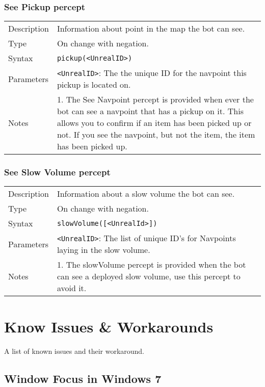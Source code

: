 \documentclass[11pt,a4paper]{article}
\begin{document}
\subsubsection*{See Pickup percept}
\begin{small}
\begin{tabular}{p{2cm}p{9cm}}
Description & Information about point in the map the bot can see.\\
Type & On change with negation.\\
Syntax & \verb|pickup(<UnrealID>)|\\
Parameters & \verb|<UnrealID>|: The the unique ID for the navpoint this pickup is located on.\\

Notes &
	1.	The See Navpoint percept is provided when ever the bot can see a navpoint that has a pickup on it. This allows you to confirm if an item has been picked up or not. If you see the navpoint, but not the item, the item has been picked up. \\
\end{tabular}
\end{small}

\subsubsection*{See Slow Volume percept}
\begin{small}
\begin{tabular}{p{2cm}p{9cm}}
Description & Information about a slow volume the bot can see.\\
Type & On change with negation.\\
Syntax & \verb|slowVolume([<UnrealId>])|\\
Parameters & \verb|<UnrealID>|: The list of unique ID's for Navpoints laying in the slow volume.\\

Notes &
	1.	The slowVolume percept is provided when the bot can see a deployed slow volume, use this percept to avoid it. \\
\end{tabular}
\end{small}


\section{Know Issues \& Workarounds}

A list of known issues and their workaround.

\subsection{Window Focus in Windows 7}
\end{document}
